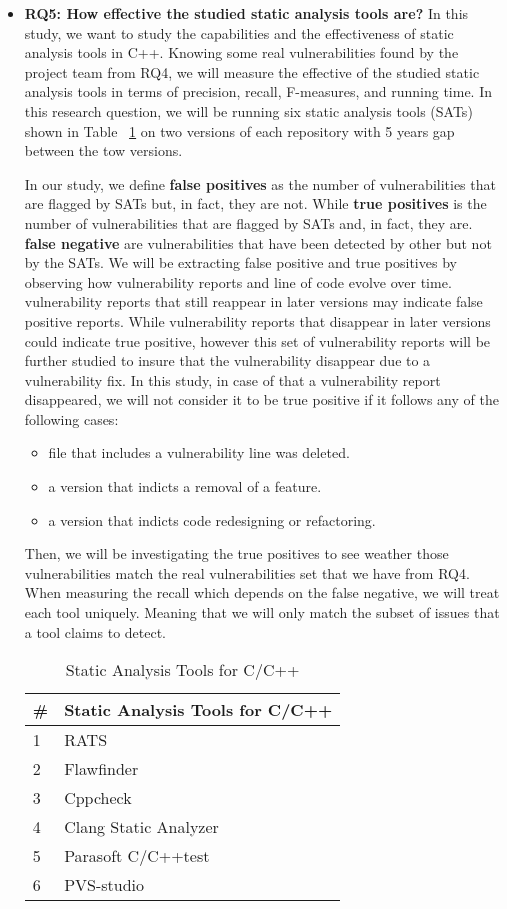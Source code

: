 \begin{itemize}
\item \textbf{RQ5: How effective the studied static analysis tools are?}
In this study, we want to study the capabilities and the effectiveness
of static analysis tools in C++. 
Knowing some real vulnerabilities found by the project team from RQ4,
we will measure the effective of the studied static analysis tools in terms of
precision, recall, F-measures, and running time. 
In this research question, we will be running six static analysis tools (SATs)
shown in Table ~\ref{SATs} on two versions of each repository
with 5 years gap between the tow versions. 


In our study, we define \textbf{false positives} as the number of vulnerabilities 
that are flagged by SATs but, in fact, they are not. 
While \textbf{true positives} is the number of vulnerabilities that
are flagged by SATs and, in fact, they are. 
\textbf{false negative} are vulnerabilities that have been detected
by other but not by the SATs. 
We will be extracting false positive and true positives by observing
how vulnerability reports and line of code evolve over time. 
vulnerability reports that still reappear in later versions may indicate false positive reports. 
While vulnerability reports that disappear in later versions could indicate true positive,
however this set of vulnerability reports will be further studied
to insure that the vulnerability disappear due to a vulnerability fix.  
In this study, in case of that a vulnerability report disappeared, 
we will not consider it to be true positive if it follows any of the following cases:

\begin{itemize}
\item file that includes a vulnerability line was deleted.
\item a version that indicts a removal of a feature.
\item a version that indicts code redesigning or refactoring.
\end{itemize}


Then, we will be investigating the true positives to see weather those vulnerabilities
match the real vulnerabilities set that we have from RQ4. 
When measuring the recall which depends on the false negative,
we will treat each tool uniquely. 
Meaning that we will only match the subset of issues that a tool claims to detect. 

\begin{table}[ht]
\centering
\scriptsize
\caption{Static Analysis Tools for C/C++}
\label{SATs}
\begin{tabular}{||p{.5cm}|p{6cm} ||}
\hline

 \textbf{\#} & \textbf{Static Analysis Tools for C/C++
} \\
\hline
\hline
 1 & RATS \\
2 & Flawfinder  \\
3 & Cppcheck  \\
4 & Clang Static Analyzer  \\
5 & Parasoft C/C++test \\
6 & PVS-studio  \\
\hline
\end{tabular}
\end{table}
 \end{itemize}
